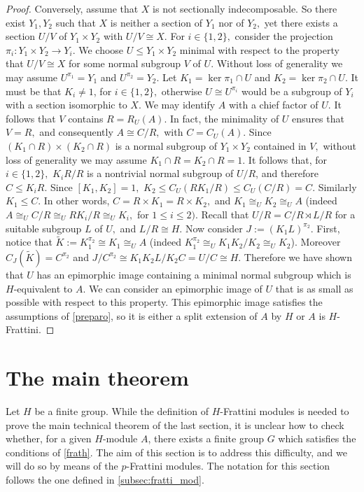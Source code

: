 \documentclass[10pt,a4paper]{amsart}
\begin{document}
\begin{proof}
Conversely, assume that $X$ is not sectionally indecomposable. 
So there exist $Y_1, Y_2$ such that $X$ is neither a section 
of $Y_1$ nor of $Y_2,$ yet there exists a section $U/V$ of 
$Y_1\times Y_2$ with $U/V\cong X.$ For $i\in\{1,2\},$ 
consider the projection $\pi_i\colon Y_1\times Y_2\to Y_i.$ 
We choose $U\leq Y_1\times Y_2$ minimal with respect to 
the property that $U/V\cong X$ for some normal subgroup 
$V$ of $U.$ Without loss of generality we may assume 
$U^{\pi_1}=Y_1$ and $U^{\pi_2}=Y_2.$ Let $K_1=\ker \pi_1\cap U$ 
and $K_2=\ker \pi_2\cap U.$ It must be that $K_i\neq 1$, for $i\in\{1,2\},$
otherwise $U\cong U^{\pi_i}$ would be a subgroup of $Y_i$ with a section isomorphic to $X$.
We may identify $A$ with a chief 
factor of $U$. It follows that $V$ contains $R=R_U(A).$ 
In fact, the minimality of $U$ ensures that $V=R,$ and consequently $A\cong C/R,$ with $C=C_U(A).$
Since $(K_1\cap R)\times (K_2\cap R)$ is a normal subgroup 
of $Y_1\times Y_2$ contained in $V,$ without loss of 
generality we may assume $K_1\cap R=K_2\cap R=1.$ It follows that, for $i\in\{1,2\},$ $K_iR/R$ is a nontrivial normal subgroup of $U/R$, and therefore $C\leq K_iR.$ Since $[K_1,K_2]=1,$
$K_2\leq C_U(RK_1/R)\leq C_U(C/R)=C.$
Similarly $K_1\leq C.$
In other words, $C=R\times K_1=R\times K_2,$ and $K_1\cong_U K_2\cong_U A$
(indeed $A\cong_U C/R \cong_U RK_i/R\cong_U K_i,$ for $1\leq i\leq 2)$.
Recall that $U/R=C/R \rtimes L/R$ for a suitable subgroup $L$ of $U,$ and
$L/R\cong H.$ Now consider $J:=(K_1L)^{\pi_2}.$ First, notice that $\tilde K:=K_1^{\pi_2}\cong K_1\cong_U A$ (indeed $K_1^{\pi_2}\cong_U K_1K_2/K_2\cong_U K_2$). Moreover $C_J(\tilde K)=C^{\pi_2}$ and $J/C^{\pi_2}\cong K_1K_2L/K_2C=U/C\cong H.$
Therefore we have shown that $U$ has an epimorphic image containing a minimal normal subgroup which is $H$-equivalent to $A$. We can consider an epimorphic image of $U$ that is as small as possible with respect to this property. This epimorphic image satisfies the assumptions of \cref{preparo}, so it is either a split extension of $A$ by $H$ or $A$ is $H$-Frattini.
\end{proof}


\section{The main theorem}\label{sec:main}

Let $H$ be a finite group. While the definition of $H$-Frattini modules is needed to prove the main technical theorem of the last section, it is unclear how to check whether, for a given $H$-module $A$, there exists a finite group $G$ which satisfies the conditions of \cref{frath}. The aim of this section is to address this difficulty, and we will do so by means of the $p$-Frattini modules. The notation for this section follows the one defined in \cref{subsec:fratti_mod}.
\end{document}
